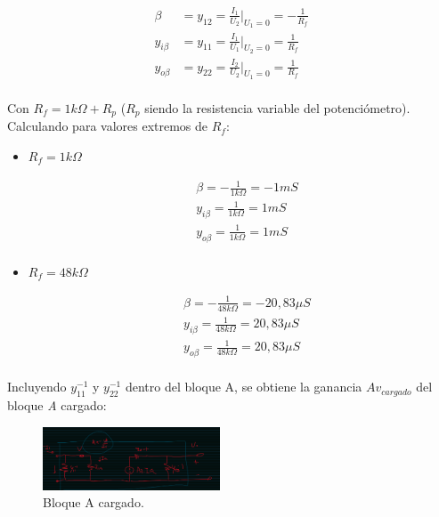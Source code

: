 \documentclass[letterpaper, 10 pt, conference]{ieeeconf}  %
\begin{document}
\begin{equation}
\begin{aligned}
\beta &= y_{12} = \frac{I_1}{U_2} \bigg\rvert_{U_1 = 0} = -\frac{1}{R_f} \\[1em]
y_{i\beta} &= y_{11} = \frac{I_1}{U_1} \bigg\rvert_{U_2 = 0} = \frac{1}{R_f}\\[1em]
y_{o\beta} &= y_{22} = \frac{I_2}{U_2} \bigg\rvert_{U_1 = 0} = \frac{1}{R_f}\\
\end{aligned}
\end{equation}

Con $R_f = 1k\Omega + R_p$ ($R_p$ siendo la resistencia variable del potenciómetro).\\
Calculando para valores extremos de $R_f$:\\

\begin{itemize}
  \item $R_f = 1k\Omega$

    \begin{equation}
    \begin{aligned}
    &\beta = -\frac{1}{1k\Omega} =  -1 mS\\[1em]
    &y_{i\beta} = \frac{1}{1k\Omega} =  1 mS\\[1em]
    &y_{o\beta} = \frac{1}{1k\Omega} = 1 mS\\
    \end{aligned}
    \end{equation}

  \item $R_f = 48k\Omega$
  
  \begin{equation}
    \begin{aligned}
    &\beta = -\frac{1}{48k\Omega} =  -20,83\mu S\\[1em]
    &y_{i\beta} = \frac{1}{48k\Omega} =  20,83\mu S\\[1em]
    &y_{o\beta} = \frac{1}{48k\Omega} = 20,83\mu S\\
    \end{aligned}
    \end{equation}
  
\end{itemize}

Incluyendo $y_{11}^{-1}$ y $y_{22}^{-1}$ dentro del bloque A, se obtiene la ganancia $Av_{cargado}$ del bloque \textit{A} cargado:

\begin{figure}[H]
  \centering
  \includegraphics[width=0.47\textwidth]{imagenes/acargado.png}
  \caption{Bloque A cargado.}
  \label{fig:diagrama_bloques_realimentacion}
\end{figure}
\end{document}
